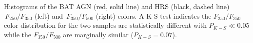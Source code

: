 \label{fig:hist_250_350_color} Histograms of the BAT AGN (red, solid line) and HRS (black, dashed line) $\,F_{250}/F_{350}$ (left) and  $\,F_{350}/F_{500}$ (right) colors. A K-S test indicates the $F_{250}/F_{350}$ color distribution for the two samples are statistically different with $P_{K-S} \ll 0.05$ while the $F_{350}/F_{500}$ are marginally similar ($P_{K-S} = 0.07$).